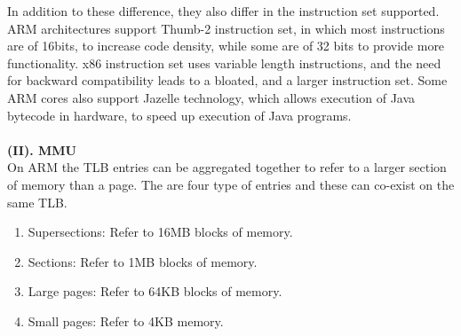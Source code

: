 \documentclass[seminar,twoside]{iitbreport}
\begin{document}
In addition to these difference, they also differ in the instruction set supported. ARM architectures support Thumb-2 instruction set, in which most instructions are of 16bits, to increase code density, while some are of 32 bits to provide more functionality. x86 instruction set uses variable length instructions, and the need for backward compatibility leads to a bloated, and a larger instruction set. 
Some ARM cores also support Jazelle technology, which allows execution of Java bytecode in hardware, to speed up execution of Java programs.
\\\\

\textbf{(II). MMU}\\

On ARM the TLB entries can be aggregated together to refer to a larger section of memory than a page. The are four type of entries and these can co-exist on the same TLB.
\begin{enumerate}
\item Supersections: Refer to 16MB blocks of memory.
\item Sections: Refer to 1MB blocks of memory.
\item Large pages: Refer to 64KB blocks of memory.
\item Small pages: Refer to 4KB memory.
\end{enumerate}
\end{document}

